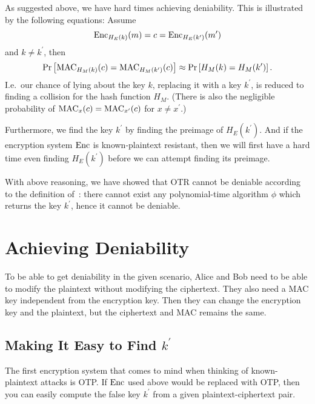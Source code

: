 {As suggested above, we have hard times achieving deniability.
This is illustrated by the following equations:
Assume
\begin{equation*}
  \operatorname{\mathrm{Enc}}_{H_E(k)}( m ) = c = \operatorname{\mathrm{Enc}}_{H_E(k^\prime)}( m^\prime )
\end{equation*}
and \(k\neq k^\prime\), then
\begin{equation*}
  \Pr\left[
    \operatorname{\mathrm{MAC}}_{H_M(k)}( c ) = \operatorname{\mathrm{MAC}}_{H_M(k^\prime)}( c )
  \right]
  \approx
  \Pr\left[ H_M(k) = H_M(k^\prime) \right].
\end{equation*}
I.e.~our chance of lying about the key \(k\), replacing it with a key 
\(k^\prime\), is reduced to finding a collision for the hash function \(H_M\).
(There is also the negligible probability of \(\operatorname{\mathrm{MAC}}_x(c) = \operatorname{\mathrm{MAC}}_{x^\prime}(c)\) 
for \(x\neq x^\prime\).)

Furthermore, we find the key \(k^\prime\) by finding the preimage of \(H_E( 
k^\prime )\).
And if the encryption system \(\operatorname{\mathrm{Enc}}\) is known-plaintext resistant, then we 
will first have a hard time even finding \(H_E( k^\prime )\) before we can 
attempt finding its preimage.

With above reasoning, we have showed that \ac{OTR} cannot be deniable according 
to the definition of~\cite{deniablecrypt}: there cannot exist any 
polynomial-time algorithm \(\phi\) which returns the key \(k^\prime\), hence it 
cannot be deniable.


\section{Achieving Deniability}

To be able to get deniability in the given scenario, Alice and Bob need to be 
able to modify the plaintext without modifying the ciphertext.
They also need a \ac{MAC} key independent from the encryption key.
Then they can change the encryption key and the plaintext, but the ciphertext 
and \ac{MAC} remains the same.

\subsection{Making It Easy to Find \(k^\prime\)}

The first encryption system that comes to mind when thinking of known-plaintext 
attacks is \ac{OTP}.
If \(\operatorname{\mathrm{Enc}}\) used above would be replaced with \ac{OTP}, then you can easily 
compute the false key \(k^\prime\) from a given plaintext-ciphertext pair.

}

